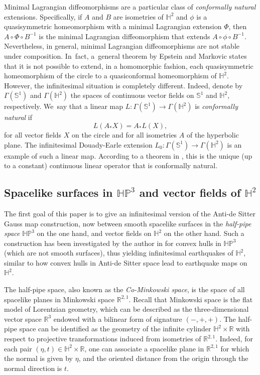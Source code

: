 \documentclass[JEP,XML,SOM,Unicode,NoEqCountersInSection, NoFloatCountersInSection,published]{cedram}
\theoremstyle{plain}
\theoremstyle{definition}
\newcommand{\HP}{\mathbb{HP}^3}
\begin{document}
Minimal Lagrangian diffeomorphisms are a particular class of \emph{conformally natural} extensions. Specifically, if \(A\) and \(B\) are isometries of \(\mathbb{H}^2\) and \(\phi\) is a quasisymmetric homeomorphism with a minimal Lagrangian extension \(\Phi\), then \(A \circ \Phi \circ B^{-1}\) is the minimal Lagrangian diffeomorphism that extends \(A \circ \phi \circ B^{-1}\). Nevertheless, in general, minimal Lagrangian diffeomorphisms are not stable under composition. In~fact, a~general theorem by Epstein and Markovic \cite{Stopdreamingthm} states that it is not possible to extend, in a homomorphic fashion, each quasisymmetric homeomorphism of the circle to a quasiconformal homeomorphism of \(\mathbb{H}^2\). However, the infinitesimal situation is completely different. Indeed, denote by $\Gamma(\mathbb{S}^1)$ and $\Gamma(\mathbb{H}^2)$ the spaces of continuous vector fields on $\mathbb{S}^1$ and $\mathbb{H}^2$, respectively. We~say that a linear map $L: \Gamma(\mathbb{S}^1) \to \Gamma(\mathbb{H}^2)$ is \emph{conformally natural} if
\[
L(A_* X) = A_* L(X),
\]
for all vector fields $X$ on the circle and for all isometries $A$ of the hyperbolic plane. The infinitesimal Douady-Earle extension $L_0: \Gamma(\mathbb{S}^1) \to \Gamma(\mathbb{H}^2)$ is an example of such a linear map. According to a theorem in \cite{Uniqueness_of_operator_L}, this is the unique (up to a constant) continuous linear operator that is conformally natural.

\subsection{Spacelike surfaces in \texorpdfstring{$\HP$}{HP}
and vector fields of \texorpdfstring{$\mathbb{H}^2$}{H2}}

The first goal of this paper is to give an infinitesimal version of the Anti-de Sitter Gauss map construction, now between smooth spacelike surfaces in the \emph{half-pipe space} \(\HP\) on the one hand, and vector fields on \(\mathbb{H}^2\) on the other hand. Such a construction has been investigated by the author in \cite{diaf2023Infearth} for convex hulls in \(\HP\) (which are not smooth surfaces), thus yielding infinitesimal earthquakes of \(\mathbb{H}^2\), similar to how convex hulls in Anti-de Sitter space lead to earthquake maps on \(\mathbb{H}^2\).

The half-pipe space, also known as the \emph{Co-Minkowski space}, is the space of all spacelike planes in Minkowski space \(\mathbb{R}^{2,1}\). Recall that Minkowski space is the flat model of Lorentzian geometry, which can be described as the three-dimensional vector space \(\mathbb{R}^3\) endowed with a bilinear form of signature \((-,+,+)\). The half-pipe space can be identified as the geometry of the infinite cylinder \(\mathbb{H}^2 \times \mathbb{R}\) with respect to projective transformations induced from isometries of \(\mathbb{R}^{2,1}\). Indeed, for each pair \((\eta,t) \in \mathbb{H}^2 \times \mathbb{R}\), one can associate a spacelike plane in \(\mathbb{R}^{2,1}\) for which the normal is given by \(\eta\), and the oriented distance from the origin through the normal direction is \(t\).
\end{document}
